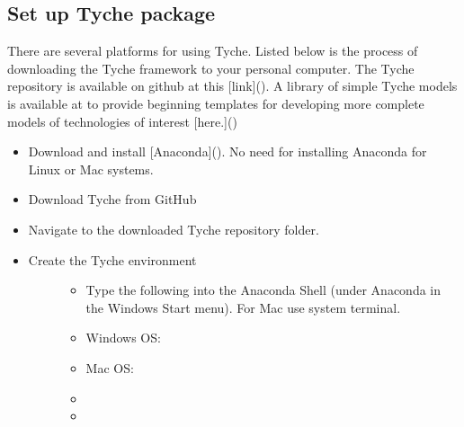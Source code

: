 \documentclass[letterpaper,10pt,english]{sphinxmanual}
\begin{document}
\subsection{Set up Tyche package}
\label{\detokenize{cheat-sheet:set-up-tyche-package}}
There are several platforms for using Tyche.  Listed below is the process of downloading the Tyche framework to your personal computer. The Tyche repository is available on github at this {[}link{]}().   A library of simple Tyche models is available at to provide beginning templates for developing more complete models of technologies of interest {[}here.{]}()
\begin{itemize}
\item {} 
Download and install {[}Anaconda{]}(). No need for installing Anaconda for Linux or Mac systems.

\item {} 
Download Tyche from GitHub

\item {} 
Navigate to the downloaded Tyche repository folder.

\item {} \begin{description}
\item[{Create the Tyche environment}] \leavevmode\begin{itemize}
\item {} 
Type the following into the Anaconda Shell (under Anaconda in the Windows Start menu). For Mac use system terminal.

\item {} 
Windows OS:  

\item {} 
Mac OS:  

\item {} 

\item {} 

\end{itemize}

\end{description}

\end{itemize}
\end{document}

